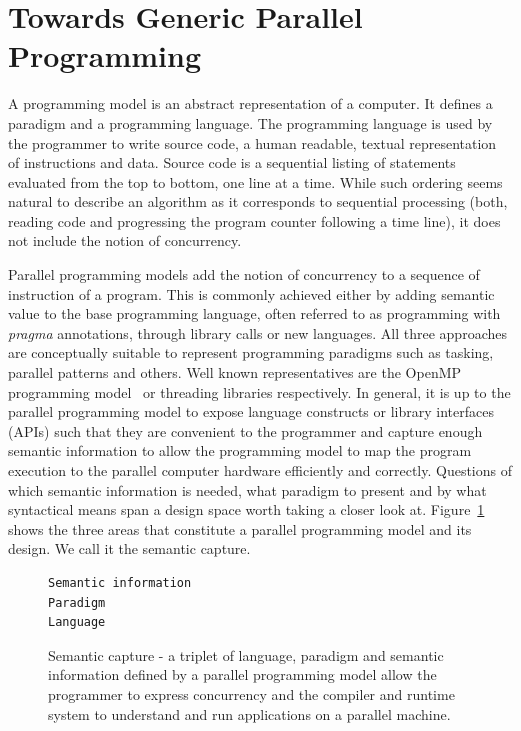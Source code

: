 \section{Towards Generic Parallel Programming}\label{chap:background}

A programming model is an abstract representation of a computer. It defines a paradigm and a programming language. The programming language is used by the programmer to write source code, a human readable, textual representation of instructions and data. Source code is a sequential listing of statements evaluated from the top to bottom, one line at a time. While such ordering seems natural to describe an algorithm as it corresponds to sequential processing (both, reading code and progressing the program counter following a time line), it does not include the notion of concurrency. 

Parallel programming models add the notion of concurrency to a sequence of instruction of a program. This is commonly achieved either by adding semantic value to the base programming language, often referred to as programming with \emph{pragma} annotations, through library calls or new languages. All three approaches are conceptually suitable to represent programming paradigms such as tasking, parallel patterns and others. Well known representatives are the OpenMP programming model~\cite{CITEOPENMP} or threading libraries respectively. In general, it is up to the parallel programming model to expose language constructs or library interfaces (APIs) such that they are convenient to the programmer and capture enough semantic information to allow the programming model to map the program execution to the parallel computer hardware efficiently and correctly. Questions of which semantic information is needed, what paradigm to present and by what syntactical means span a design space worth taking a closer look at. Figure~\ref{figSemCapture} shows the three areas that constitute a parallel programming model and its design. We call it the semantic capture.

\begin{figure}[h]
\begin{Verbatim}[frame=leftline]
Semantic information
Paradigm 
Language
\end{Verbatim}
\caption{Semantic capture - a triplet of language, paradigm and semantic information defined by a parallel programming model allow the programmer to express concurrency and the compiler and runtime system to understand and run applications on a parallel machine.}
\label{figSemCapture}
\end{figure}

